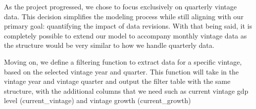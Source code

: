 \documentclass[
]{article}
\newenvironment{Shaded}{\begin{snugshade}}{\end{snugshade}}
\newcommand{\AttributeTok}[1]{\textcolor[rgb]{0.13,0.29,0.53}{#1}}
\newcommand{\ControlFlowTok}[1]{\textcolor[rgb]{0.13,0.29,0.53}{\textbf{#1}}}
\newcommand{\DecValTok}[1]{\textcolor[rgb]{0.00,0.00,0.81}{#1}}
\newcommand{\FunctionTok}[1]{\textcolor[rgb]{0.13,0.29,0.53}{\textbf{#1}}}
\newcommand{\NormalTok}[1]{#1}
\newcommand{\OtherTok}[1]{\textcolor[rgb]{0.56,0.35,0.01}{#1}}
\newcommand{\SpecialCharTok}[1]{\textcolor[rgb]{0.81,0.36,0.00}{\textbf{#1}}}
\newcommand{\StringTok}[1]{\textcolor[rgb]{0.31,0.60,0.02}{#1}}
\begin{document}
\begin{Shaded}
\end{Shaded}

As the project progressed, we chose to focus exclusively on quarterly
vintage data. This decision simplifies the modeling process while still
aligning with our primary goal: quantifying the impact of data
revisions. With that being said, it is completely possible to extend our
model to accompany monthly vintage data as the structure would be very
similar to how we handle quarterly data.

Moving on, we define a filtering function to extract data for a specific
vintage, based on the selected vintage year and quarter. This function
will take in the vintage year and vintage quarter and output the filter
table with the same structure, with the additional columns that we need
such as current vintage gdp level (current\_vintage) and vintage growth
(current\_growth)
\end{document}

